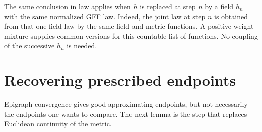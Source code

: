 \documentclass[11pt]{article}
\theoremstyle{definition}
\theoremstyle{remark}
\begin{document}
The same conclusion in law applies when $h$ is replaced at step
$n$ by a field $h_n$ with the same normalized GFF law. Indeed,
the joint law at step $n$ is obtained from that one field law
by the same field and metric functions. A positive-weight
mixture supplies common versions for this countable list of
functions. No coupling of the successive $h_n$ is needed.

\section{Recovering prescribed endpoints}\label{sec:endpoints}
Epigraph convergence gives good approximating endpoints, but not
necessarily the endpoints one wants to compare. The next lemma
is the step that replaces Euclidean continuity of the metric.
\end{document}

